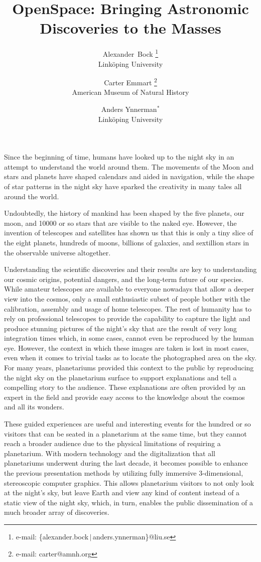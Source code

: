 \documentclass{vgtc}                %
\title{OpenSpace: Bringing Astronomic Discoveries to the Masses}
\author{Alexander~Bock%
\thanks{e-mail: \{alexander.bock\,$\vert$\,anders.ynnerman\}@liu.se}\\%
\scriptsize Link\"oping University%
\and Carter Emmart%
\thanks{e-mail: carter@amnh.org}\\%
\scriptsize American Museum of Natural History%
\and Anders Ynnerman$^\ast$\\%
\scriptsize Link\"oping University%
}
\begin{document}
\maketitle

Since the beginning of time, humans have looked up to the night sky in an attempt to understand the world around them. The movements of the Moon and stars and planets have shaped calendars and aided in navigation, while the shape of star patterns in the night sky have sparked the creativity in many tales all around the world.

Undoubtedly, the history of mankind has been shaped by the five planets, our moon, and 10000 or so stars that are visible to the naked eye. However, the invention of telescopes and satellites has shown us that this is only a tiny slice of the eight planets, hundreds of moons, billions of galaxies, and sextillion stars in the observable universe altogether.

Understanding the scientific discoveries and their results are key to understanding our cosmic origins, potential dangers, and the long-term future of our species. While amateur telescopes are available to everyone nowadays that allow a deeper view into the cosmos, only a small enthusiastic subset of people bother with the calibration, assembly and usage of home telescopes. The rest of humanity has to rely on professional telescopes to provide the capability to capture the light and produce stunning pictures of the night's sky that are the result of very long integration times which, in some cases, cannot even be reproduced by the human eye. However, the context in which these images are taken is lost in most cases, even when it comes to trivial tasks as to locate the photographed area on the sky. For many years, planetariums provided this context to the public by reproducing the night sky on the planetarium surface to support explanations and tell a compelling story to the audience. These explanations are often provided by an expert in the field and provide easy access to the knowledge about the cosmos and all its wonders.

These guided experiences are useful and interesting events for the hundred or so visitors that can be seated in a planetarium at the same time, but they cannot reach a broader audience due to the physical limitations of requiring a planetarium. With modern technology and the digitalization that all planetariums underwent during the last decade, it becomes possible to enhance the previous presentation methods by utilizing fully immersive 3-dimensional, stereoscopic computer graphics. This allows planetarium visitors to not only look at the night's sky, but leave Earth and view any kind of content instead of a static view of the night sky, which, in turn, enables the public dissemination of a much broader array of discoveries.
\end{document}
